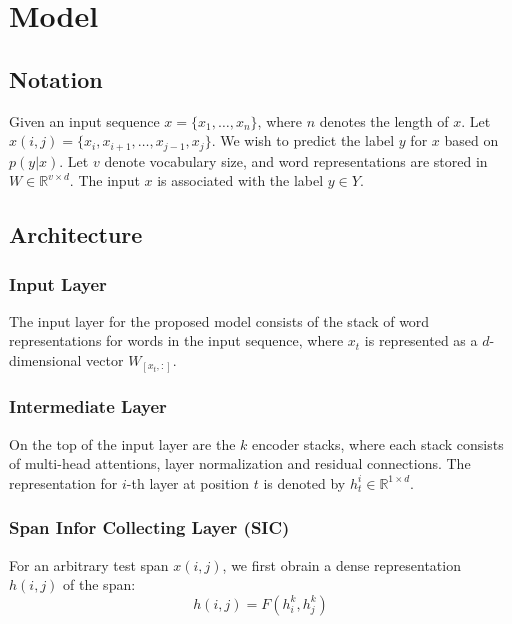 \section{Model}

\subsection{Notation}

Given an input sequence $x = \{ x_1, \dots, x_n \}$, where $n$ denotes the
length of $x$. Let $x(i, j) = \{ x_i, x_{i+1}, \dots, x_{j-1}, x_j \}$. We wish
to predict the label $y$ for $x$ based on $p(y|x)$. Let $v$ denote vocabulary
size, and word representations are stored in $W \in \mathbb{R}^{v \times d}$.
The input $x$ is associated with the label $y \in Y$.

\subsection{Architecture}

\subsubsection{Input Layer}

The input layer for the proposed model consists of the stack of word
representations for words in the input sequence, where $x_t$ is represented as a
$d$-dimensional vector $W_{[x_t,:]}$.

\subsubsection{Intermediate Layer}

On the top of the input layer are the $k$ encoder stacks, where each stack
consists of multi-head attentions, layer normalization and residual connections.
The representation for $i$-th layer at position $t$ is denoted by $h_t^i \in
\mathbb{R}^{1 \times d}$.

\subsubsection{Span Infor Collecting Layer (SIC)}

For an arbitrary test span $x(i, j)$, we first obrain a dense representation
$h(i, j)$ of the span:
\begin{equation}
    h(i, j) = F(h_i^k, h_j^k)
\end{equation}

